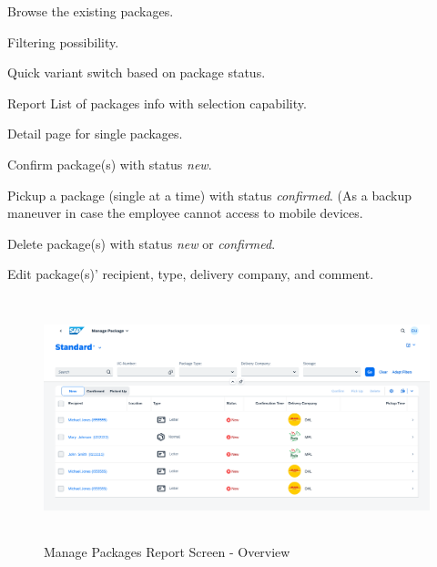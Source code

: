 \begin{compactenum}
	\item Browse the existing packages.
        \begin{compactenum}
            \item Filtering possibility.
            \item Quick variant switch based on package status.
            \item Report List of packages info with selection capability.
            \item Detail page for single packages.
        \end{compactenum}
    \item Confirm package(s) with status \textit{new}.
    \item Pickup a package (single at a time) with status \textit{confirmed}. (As a backup maneuver in case the employee cannot access to mobile devices.
    \item Delete package(s) with status \textit{new} or \textit{confirmed}.
    \item Edit package(s)' recipient, type, delivery company, and comment.
\end{compactenum}

\begin{figure}[H]
	\centering
	\includegraphics[height=200pt]{images/user_doc/managePack/ReportScreen/browse/Overview.png}
	\caption{Manage Packages Report Screen - Overview}
	\label{fig:MPReportOverview}
\end{figure}


